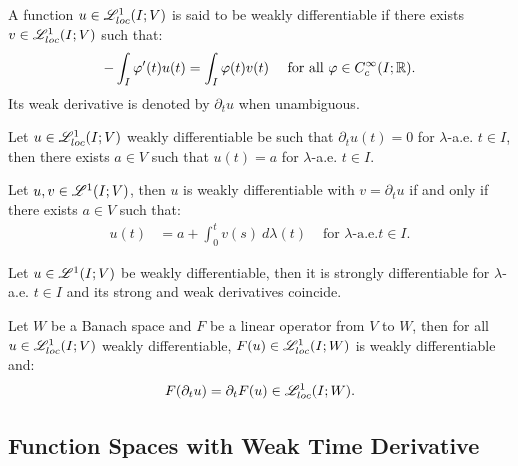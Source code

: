 \begin{definition}
    A function $u \in \mathscr{L}^{1}_{loc}(I; V)$ is said to be weakly differentiable if there exists $v \in \mathscr{L}^{1}_{loc}(I; V)$ such that:
    \begin{align}
        - \int_I \varphi^{\prime}(t) u(t) &= \int_I \varphi(t) v(t) &\text{ for all } \varphi \in C_c^{\infty}(I; \mathbb{R}).
    \end{align}
    Its weak derivative is denoted by $\partial_t u$ when unambiguous.
\end{definition}

\begin{lemma}
    Let $u \in \mathscr{L}^{1}_{loc}(I; V)$ weakly differentiable be such that $\partial_t u(t) = 0$ for $\lambda$-a.e. $t \in I$, then there exists $a \in V$ such that $u(t) = a$ for $\lambda$-a.e. $t \in I$.
\end{lemma}

\begin{theorem}
    Let $u, v \in \mathscr{L}^{1}(I; V)$, then $u$ is weakly differentiable with $v = \partial_t u$ if and only if there exists $a \in V$ such that:
    \begin{align}
        u(t) &= a + \int_0^t v(s) ~ d \lambda(t) &\text{ for } \lambda \text{-a.e.} t \in I.
    \end{align}
\end{theorem}

\begin{corollary}
    Let $u \in \mathscr{L}^{1}(I; V)$ be weakly differentiable, then it is strongly differentiable for $\lambda$-a.e. $t \in I$ and its strong and weak derivatives coincide.
\end{corollary}

\begin{lemma}
    Let $W$ be a Banach space and $F$ be a linear operator from $V$ to $W$, then for all $u \in \mathscr{L}^{1}_{loc}(I; V)$ weakly differentiable, $F(u) \in \mathscr{L}^{1}_{loc}(I; W)$ is weakly differentiable and:
    \begin{align}
        F(\partial_t u) = \partial_t F(u) \in \mathscr{L}^{1}_{loc}(I; W).
    \end{align}
\end{lemma}

\newpage
\subsection{Function Spaces with Weak Time Derivative}

